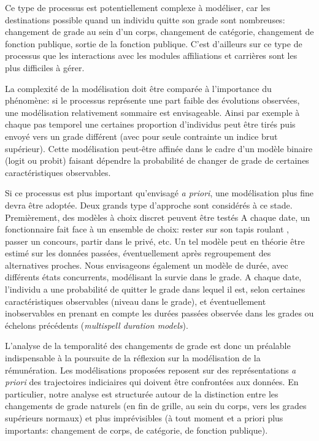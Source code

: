 \documentclass[11pt,a4paper]{article}
\begin{document}
Ce type de processus est potentiellement complexe à modéliser, car les destinations possible quand un individu quitte son grade sont nombreuses: changement de grade au sein d'un corps, changement de catégorie, changement de fonction publique, sortie de la fonction publique. C'est d'ailleurs sur ce type de processus que les interactions avec les modules affiliations et carrières sont les plus difficiles à gérer. 

La complexité de la modélisation doit être comparée à l'importance du phénomène: si le processus représente une part faible des évolutions observées, une modélisation relativement sommaire est envisageable. Ainsi par exemple à chaque pas temporel une certaines proportion d'individus peut être tirés puis envoyé vers un grade différent (avec pour seule contrainte un indice brut supérieur). Cette modélisation peut-être affinée dans le cadre d'un modèle binaire (logit ou probit) faisant dépendre la probabilité de changer de grade de certaines caractéristiques observables. 

Si ce processus est plus important qu'envisagé \textit{a priori}, une modélisation plus fine devra être adoptée. Deux grands type d'approche sont considérés à ce stade. Premièrement, des modèles à choix discret peuvent être testés A chaque date, un fonctionnaire fait face à un ensemble de choix: rester sur son \og tapis roulant \fg{}, passer un concours, partir dans le privé, etc. Un tel modèle peut en théorie être estimé sur les données passées, éventuellement après regroupement des alternatives proches. Nous envisageons également un modèle de durée, avec différents états concurrents, modélisant la survie dans le grade. A chaque date, l'individu a une probabilité de quitter le grade dans lequel il est, selon certaines caractéristiques observables (niveau dans le grade), et éventuellement inobservables en prenant en compte les durées passées observée dans les grades ou échelons précédents (\textit{multispell duration models}). 


\bigskip

L'analyse de la temporalité des changements de grade est donc un préalable indispensable à la poursuite de la réflexion sur la modélisation de la rémunération. Les modélisations proposées reposent sur des représentations \textit{a priori} des trajectoires indiciaires qui doivent être confrontées aux données. En particulier, notre analyse est structurée autour de la distinction entre les changements de grade \og naturels \fg{} (en fin de grille, au sein du corps, vers les grades supérieurs normaux) et plus imprévisibles (à tout moment et a priori plus importants: changement de corps, de catégorie, de fonction publique).  
\end{document}
